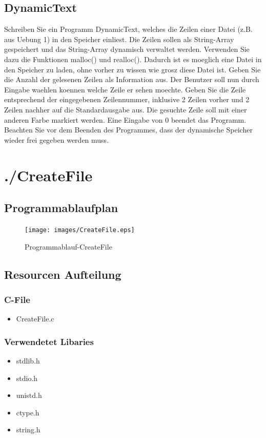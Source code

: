 \documentclass{scrartcl}
\begin{document}
\subsection{DynamicText}
Schreiben Sie ein Programm DynamicText, welches die Zeilen einer Datei (z.B. aus Uebung 1) in den Speicher einliest. Die Zeilen sollen als String-Array gespeichert und das String-Array dynamisch verwaltet werden. Verwenden Sie dazu die Funktionen malloc() und realloc(). Dadurch ist es moeglich eine Datei in den Speicher zu laden, ohne vorher zu wissen wie grosz diese Datei ist. Geben Sie die Anzahl der gelesenen Zeilen als Information aus. Der Benutzer soll nun durch Eingabe waehlen koennen welche Zeile er sehen moechte. Geben Sie die Zeile entsprechend der eingegebenen Zeilennummer, inklusive 2 Zeilen vorher und 2 Zeilen nachher auf die Standardausgabe aus. Die gesuchte Zeile soll mit einer anderen Farbe markiert werden. Eine Eingabe von 0 beendet das Programm. Beachten Sie vor dem Beenden des Programmes, dass der dynamische Speicher wieder frei gegeben werden muss.
\section{./CreateFile}
\subsection{Programmablaufplan}
\begin{figure}[H]
  \centering
  \texttt{[image: images/CreateFile.eps]}
  \caption{Programmablauf-CreateFile}
  \label{fig:digraph}
\end{figure}
\subsection{Resourcen Aufteilung}
\subsubsection{C-File}
\begin{itemize}
\item CreateFile.c
\end{itemize}
\subsubsection{Verwendetet Libaries}
\begin{itemize}
\item stdlib.h
\item stdio.h
\item unistd.h
\item ctype.h
\item string.h
\end{itemize}
\end{document}
